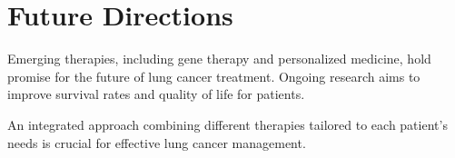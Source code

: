 \section{Future Directions}
\begin{remark}
Emerging therapies, including gene therapy and personalized medicine, hold promise for the future of lung cancer treatment. Ongoing research aims to improve survival rates and quality of life for patients.
\end{remark}

An integrated approach combining different therapies tailored to each patient's needs is crucial for effective lung cancer management.